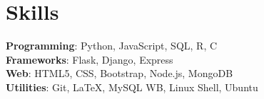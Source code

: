 \section*{\sc Skills}
\vspace{-2mm}
\hrulefill
\vspace{1mm}

\textbf{Programming}: Python, JavaScript, SQL, R, C\\
\textbf{Frameworks}: Flask, Django, Express\\
\textbf{Web}: HTML5, CSS, Bootstrap, Node.js, MongoDB\\
\textbf{Utilities}: Git, \LaTeX, MySQL WB, Linux Shell, Ubuntu\\
